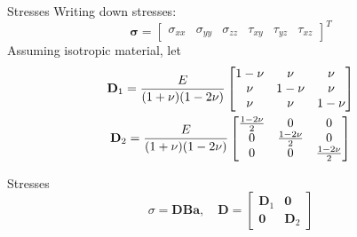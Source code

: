 \documentclass[10pt]{beamer}
\numberwithin{equation}{subsection}
\begin{document}
\begin{frame}{Stresses}
    Writing down stresses:
    \begin{equation}\label{stress}
			\mathbf{\sigma} = \begin{bmatrix} 
			                    \sigma_{xx} & 
			                    \sigma_{yy} & 
			                    \sigma_{zz} &
			                    \tau_{xy}   &
			                    \tau_{yz}   &
			                    \tau_{xz}
			                   \end{bmatrix}^T
		\end{equation}
		Assuming isotropic material, let
		\begin{gather}
			\mathbf{D}_1 = \frac{E}{(1 + \nu)(1 - 2\nu)}
				\begin{bmatrix}
					1 - \nu 	& \nu 		& \nu \\
					\nu 		& 1 - \nu  	& \nu \\
					\nu		& \nu		& 1 - \nu
				\end{bmatrix} \\ \notag
			\mathbf{D}_2 = \frac{E}{(1 + \nu)(1 - 2\nu)}
				\begin{bmatrix}
					\frac{1-2\nu}2 	& 0 		& 0 \\
					0 		& \frac{1-2\nu}2& 0 \\
					0		& 0		& \frac{1-2\nu}2
				\end{bmatrix}
		\end{gather}
		\begin{alertblock}{Stresses}
		    \begin{equation}\label{sigma}
		       \sigma = \mathbf{DBa}, \quad 
		       \mathbf{D} = 
				\begin{bmatrix}
					\mathbf{D}_1 	& \mathbf{0}	\\
					\mathbf{0}	& \mathbf{D}_2
				\end{bmatrix} 
			\end{equation}
		\end{alertblock}
\end{frame}
\end{document}
